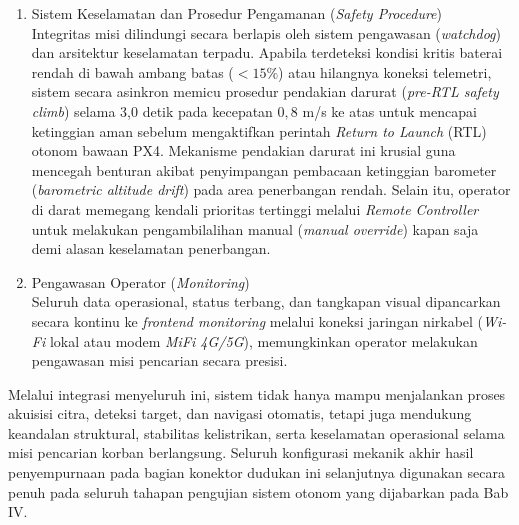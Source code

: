 \begin{enumerate}
	\item Sistem Keselamatan dan Prosedur Pengamanan (\textit{Safety Procedure}) \\
	Integritas misi dilindungi secara berlapis oleh sistem pengawasan (\textit{watchdog}) dan arsitektur keselamatan terpadu. Apabila terdeteksi kondisi kritis baterai rendah di bawah ambang batas ($< 15\%$) atau hilangnya koneksi telemetri, sistem secara asinkron memicu prosedur pendakian darurat (\textit{pre-RTL safety climb}) selama 3,0 detik pada kecepatan $0,8$ m/s ke atas untuk mencapai ketinggian aman sebelum mengaktifkan perintah \textit{Return to Launch} (RTL) otonom bawaan PX4. Mekanisme pendakian darurat ini krusial guna mencegah benturan akibat penyimpangan pembacaan ketinggian barometer (\textit{barometric altitude drift}) pada area penerbangan rendah. Selain itu, operator di darat memegang kendali prioritas tertinggi melalui \textit{Remote Controller} untuk melakukan pengambilalihan manual (\textit{manual override}) kapan saja demi alasan keselamatan penerbangan.
	
	\item Pengawasan Operator (\textit{Monitoring}) \\
	Seluruh data operasional, status terbang, dan tangkapan visual dipancarkan secara kontinu ke \textit{frontend monitoring} melalui koneksi jaringan nirkabel (\textit{Wi-Fi} lokal atau modem \textit{MiFi 4G/5G}), memungkinkan operator melakukan pengawasan misi pencarian secara presisi.
\end{enumerate}

Melalui integrasi menyeluruh ini, sistem tidak hanya mampu menjalankan proses akuisisi citra, deteksi target, dan navigasi otomatis, tetapi juga mendukung keandalan struktural, stabilitas kelistrikan, serta keselamatan operasional selama misi pencarian korban berlangsung. Seluruh konfigurasi mekanik akhir hasil penyempurnaan pada bagian konektor dudukan ini selanjutnya digunakan secara penuh pada seluruh tahapan pengujian sistem otonom yang dijabarkan pada Bab IV.
